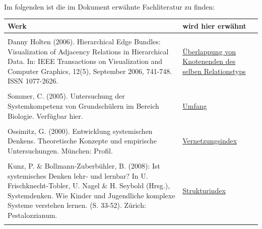 \documentclass[enabledeprecatedfontcommands,fontsize=11pt,paper=a4,twoside]{scrartcl}
\begin{document}
\\ \\ \\
Im folgenden ist die im Dokument erwähnte Fachliteratur zu finden: \\
\begin{tabular}{p{11cm}p{5cm}}
	Werk & wird hier erwähnt \\ \hline \\
	Danny Holten (2006). Hierarchical Edge Bundles: Visualization of Adjacency Relations in Hierarchical Data. In: IEEE Transactions on Visualization and Computer Graphics, 12(5), September 2006, 741-748. ISSN 1077-2626. & \hyperlink{Überlappung von Knotenenden des selben Relationstyps}{Überlappung von Knotenenden des selben Relationstyps} \\ \\ 
	Sommer, C. (2005). Untersuchung der Systemkompetenz von Grundschülern im Bereich Biologie. Verfügbar hier. & \hyperlink{Umfang}{Umfang} \\ \\
	Ossimitz, G. (2000). Entwicklung systemischen Denkens. Theoretische Konzepte und empirische Untersuchungen. München: Profil. & \hyperlink{Vernetzungsindex}{Vernetzungsindex} \\ \\
	Kunz, P. \& Bollmann-Zuberbühler, B. (2008): Ist systemisches Denken lehr- und lernbar? In U. Frischknecht-Tobler, U. Nagel \& H. Seybold (Hrsg.), Systemdenken. Wie Kinder und Jugendliche komplexe Systeme verstehen lernen. (S. 33-52). Zürich: Pestalozzianum. & \hyperlink{Strukturindex}{Strukturindex} \\ \\
\end{tabular}




\newpage
\end{document}
